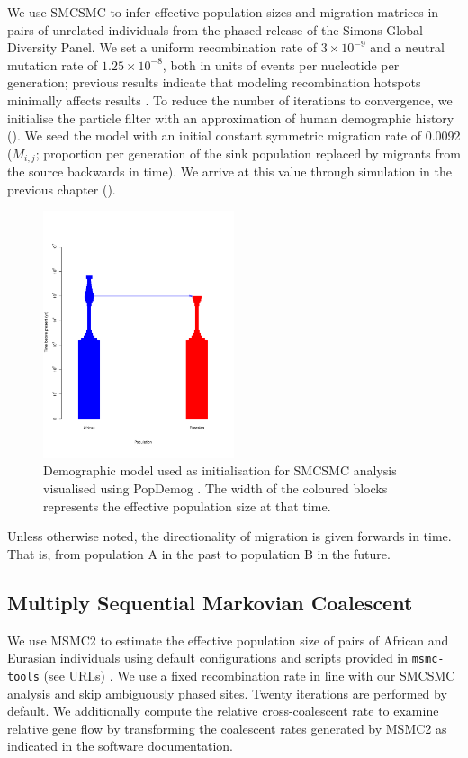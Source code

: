 We use SMCSMC to infer effective population sizes and migration matrices in pairs of unrelated individuals from the phased release of the Simons Global Diversity Panel. We set a uniform recombination rate of $3\times10^{-9}$ and a neutral mutation rate of $1.25\times10^{-8}$, both in units of events per nucleotide per generation; previous results indicate that modeling recombination
hotspots minimally affects results \cite{Li2011}. To reduce the number of iterations to convergence, we initialise the particle filter with an approximation of human demographic history ().
We seed the model with an initial constant symmetric  migration rate of 0.0092 ($M_{i,j}$; proportion per generation of the sink population replaced by migrants from the source backwards in time). We arrive at this value through simulation in the previous chapter ().

\begin{figure}
	\centering
	\includegraphics[width=0.5\textwidth]{plot/dem_smc2.pdf}
	\caption[SMCSMC seed demographic model]{Demographic model used as initialisation for SMCSMC analysis visualised using PopDemog \cite{Zhou2018}. The width of the coloured blocks represents the effective population size at that time.}
	\label{fig:smc2demog}
\end{figure}

Unless otherwise noted, the directionality of migration is given forwards in time. That is, from population A in the past to population B in the future. 


\subsection{Multiply Sequential Markovian Coalescent} We use MSMC2 to estimate the effective population size of pairs of African and Eurasian individuals using default configurations and scripts provided in {\tt msmc-tools} (see URLs) \cite{Schiffels2014, Wang2019a}. We use a fixed recombination rate in line with our SMCSMC analysis and skip ambiguously phased sites. Twenty iterations are performed by default. We additionally compute the relative cross-coalescent rate to examine relative gene flow by transforming the coalescent rates generated by MSMC2 as indicated in the software documentation.

